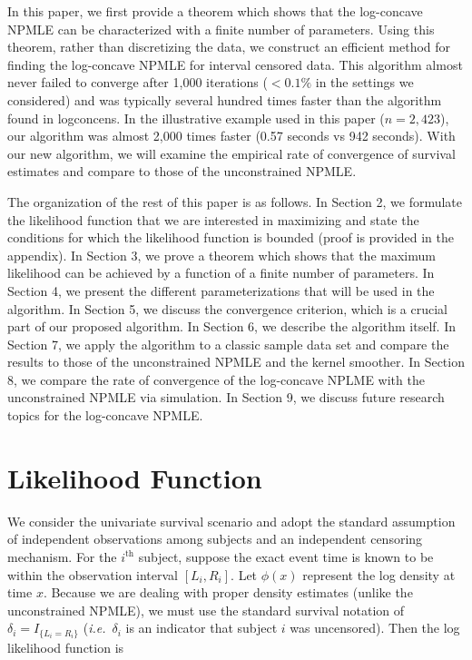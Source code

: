 	In this paper, we first provide a theorem which shows that the log-concave NPMLE can be characterized with a finite number of parameters. Using this theorem, rather than discretizing the data, we construct an efficient method for finding the log-concave NPMLE for interval censored data. This algorithm almost never failed to converge after 1,000 iterations ($< 0.1\%$ in the settings we considered) and was typically several hundred times faster than the algorithm found in logconcens. In the illustrative example used in this paper ($n = 2,423$), our algorithm was almost 2,000 times faster (0.57 seconds vs 942 seconds). With our new algorithm, we will examine the empirical rate of convergence of survival estimates and compare to those of the unconstrained NPMLE. 
	
	The organization of the rest of this paper is as follows.  In Section 2, we formulate the likelihood function that we are interested in maximizing and state the conditions for which the likelihood function is bounded (proof is provided in the appendix). In Section 3, we prove a theorem which shows that the maximum likelihood can be achieved by a function of a finite number of parameters. In Section 4, we present the different parameterizations that will be used in the algorithm. In Section 5, we discuss the convergence criterion, which is a crucial part of our proposed algorithm. In Section 6, we describe the algorithm itself. In Section 7, we apply the algorithm to a classic sample data set and compare the results to those of the unconstrained NPMLE and the kernel smoother. In Section 8, we compare the rate of convergence of the log-concave NPLME with the unconstrained NPMLE via simulation. In Section 9, we discuss future research topics for the log-concave NPMLE.


\section{Likelihood Function}
\label{sec:1}

	We consider the univariate survival scenario and adopt the standard assumption of independent observations among subjects and an independent censoring mechanism. For the $i^{\mathrm{th} } $ subject, suppose the exact event time is known to be within the observation interval $[L_i, R_i]$.  Let $\phi(x)$ represent the log density at time $x$. Because we are dealing with proper density estimates (unlike the unconstrained NPMLE), we must use the standard survival notation of $\delta_i = I_{ \{ L_i = R_i \} }$ (\emph{i.e.}\ $\delta_i$ is an indicator that subject $i$ was uncensored).  Then the log likelihood function is 
	
